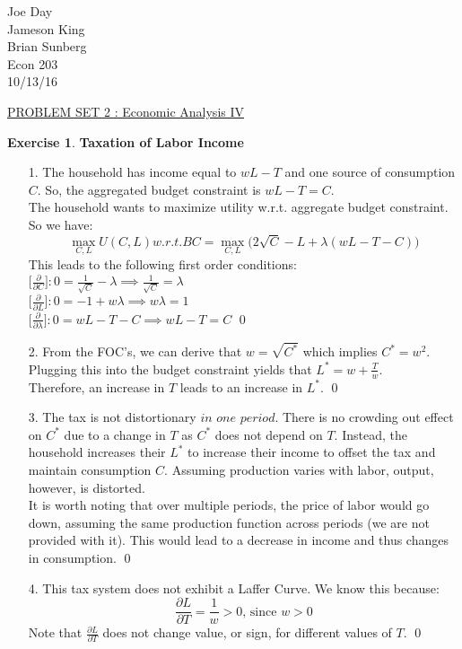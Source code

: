 \documentclass[12pt]{article}
\theoremstyle{definition}
\newtheorem{exercise}[theorem]{Exercise}
\newcommand{\V}{\vspace{0.3cm}\\}
\begin{document}
\begin{flushright}
Joe Day\\
Jameson King\\
Brian Sunberg\\
Econ 203\\
10/13/16
\end{flushright}
\begin{center}
\underline{PROBLEM SET 2 : Economic Analysis IV}
\end{center}

\begin{exercise} \textbf{Taxation of Labor Income}
\begin{enumerate}
    \item [1.] The household has income equal to $wL - T$ and one source of consumption $C$. So, the aggregated budget constraint is $wL-T = C$. \V
    The household wants to maximize utility w.r.t. aggregate budget constraint. So we have: 
    $$\max_{C,L} U(C,L) w.r.t. BC = \max_{C,L} \Big( 2\sqrt{C} - L + \lambda(wL-T-C) \Big) $$ This leads to the following first order conditions: \V
    $\Big[ \frac{\partial}{\partial C} \Big] : 0 = \frac{1}{\sqrt{C}} - \lambda \implies \frac{1}{\sqrt{C}} = \lambda $ \V
    $\Big[ \frac{\partial}{\partial L} \Big] : 0 = -1 + w\lambda \implies w\lambda = 1 $ \V
    $\Big[ \frac{\partial}{\partial \lambda} \Big] : 0 = wL-T-C \implies wL - T = C$ \qed
    \item [2.] From the FOC's, we can derive that $w = \sqrt{C^*}$ which implies $C^* = w^2$. \V
    Plugging this into the budget constraint yields that $L^* = w + \frac{T}{w}$. \V
    Therefore, an increase in $T$ leads to an increase in $L^*$. \qed
    \item [3.] The tax is not distortionary $\textit{in one period}$. There is no crowding out effect on $C^*$ due to a change in $T$ as $C^*$ does not depend on $T$. Instead, the household increases their $L^*$ to increase their income to offset the tax and maintain consumption $C$. Assuming production varies with labor, output, however, is distorted.\V
    It is worth noting that over multiple periods, the price of labor would go down, assuming the same production function across periods (we are not provided with it). This would lead to a decrease in income and thus changes in consumption. \qed
    \item [4.] This tax system does not exhibit a Laffer Curve. We know this because: 
    $$\frac{\partial L}{\partial T} = \frac{1}{w} >0  \text{, since } w>0$$
    Note that $\displaystyle \frac{\partial L}{\partial T}$ does not change value, or sign, for different values of $T$. \qed \newpage

\end{enumerate}
\end{exercise}
\end{document}
